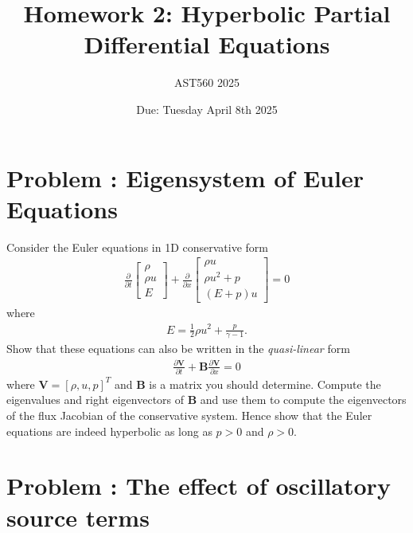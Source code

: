 \documentclass[12pt]{article}
\title{Homework 2: Hyperbolic Partial Differential Equations}%
\author{AST560 2025}%
\date{Due: Tuesday April 8th 2025}
\theoremstyle{definition}
\theoremstyle{definition}
\theoremstyle{definition}
\newcommand{\pfrac}[2]{\frac{\partial #1}{\partial #2}}
\newcommand{\mvec}[1]{\mathbf{#1}}
\newcounter{probnum}
\begin{document}
\maketitle

\section*{Problem : Eigensystem of Euler Equations}

Consider the Euler equations in 1D conservative form
\begin{align*}
  \frac{\partial}{\partial{t}}
  \left[
    \begin{matrix}
      \rho \\
      \rho u \\
      E
    \end{matrix}
  \right]
  +
  \frac{\partial}{\partial{x}}
  \left[
    \begin{matrix}
      \rho u \\
      \rho u^2 + p \\
      (E+p)u
    \end{matrix}
  \right]
  =
  0
\end{align*}
where
\begin{align*}
  E = \frac{1}{2}\rho u^2 + \frac{p}{\gamma-1}.
\end{align*}
Show that these equations can also be written in the
\emph{quasi-linear} form
\begin{align*}
  \pfrac{\mvec{V}}{t} + \mvec{B}\pfrac{\mvec{V}}{x} = 0
\end{align*}
where $\mvec{V} = [\rho, u, p]^T$ and $\mvec{B}$ is a matrix you
should determine. Compute the eigenvalues and right eigenvectors of
$\mvec{B}$ and use them to compute the eigenvectors of the flux
Jacobian of the conservative system. Hence show that the Euler
equations are indeed hyperbolic as long as $p>0$ and $\rho > 0$.

\section*{Problem : The effect of oscillatory source
  terms}
\end{document}
